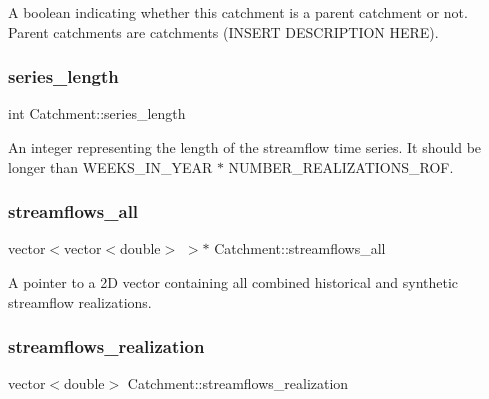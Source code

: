 A boolean indicating whether this catchment is a parent catchment or not. Parent catchments are catchments (I\+N\+S\+E\+RT D\+E\+S\+C\+R\+I\+P\+T\+I\+ON H\+E\+RE). 

\mbox{\label{classCatchment_a2d4994220f63b876348b4ce4892bc6d3}} 
\subsubsection{\texorpdfstring{series\+\_\+length}{series\_length}}
{\footnotesize\ttfamily int Catchment\+::series\+\_\+length\hspace{0.3cm}{\ttfamily [protected]}}



An integer representing the length of the streamflow time series. It should be longer than W\+E\+E\+K\+S\+\_\+\+I\+N\+\_\+\+Y\+E\+AR $\ast$ N\+U\+M\+B\+E\+R\+\_\+\+R\+E\+A\+L\+I\+Z\+A\+T\+I\+O\+N\+S\+\_\+\+R\+OF. 

\mbox{\label{classCatchment_a579ccda86831f286c19c76354e7125c3}} 
\subsubsection{\texorpdfstring{streamflows\+\_\+all}{streamflows\_all}}
{\footnotesize\ttfamily vector$<$vector$<$double$>$ $>$$\ast$ Catchment\+::streamflows\+\_\+all\hspace{0.3cm}{\ttfamily [protected]}}



A pointer to a 2D vector containing all combined historical and synthetic streamflow realizations. 

\mbox{\label{classCatchment_aaf04c295ecd6b666fa1439d3d5bc072a}} 
\subsubsection{\texorpdfstring{streamflows\+\_\+realization}{streamflows\_realization}}
{\footnotesize\ttfamily vector$<$double$>$ Catchment\+::streamflows\+\_\+realization\hspace{0.3cm}{\ttfamily [protected]}}



